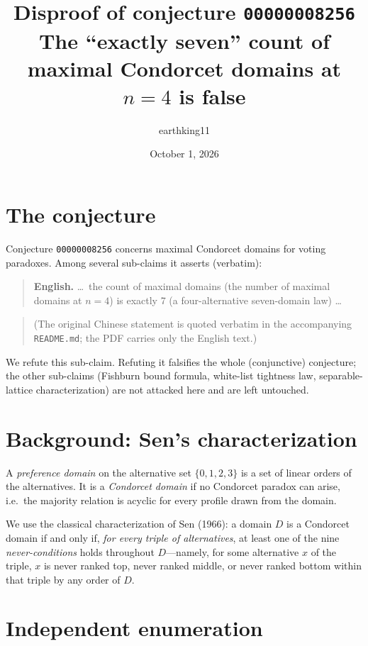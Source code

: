 \documentclass[11pt]{article}
\title{Disproof of conjecture \texttt{00000008256} \\[0.3em]
  \large The ``exactly seven'' count of maximal Condorcet domains at $n=4$ is false}
\author{earthking11}
\date{October 1, 2026}
\begin{document}
\maketitle

\section{The conjecture}

Conjecture \texttt{00000008256} concerns maximal Condorcet domains for voting
paradoxes.  Among several sub-claims it asserts (verbatim):

\begin{quote}
  \textbf{English.} \dots\ the count of maximal domains (the number of maximal
  domains at $n = 4$) is exactly 7 (a four-alternative seven-domain law) \dots
\end{quote}

\begin{quote}
  (The original Chinese statement is quoted verbatim in the accompanying
  \texttt{README.md}; the PDF carries only the English text.)
\end{quote}

We refute this sub-claim.  Refuting it falsifies the whole (conjunctive)
conjecture; the other sub-claims (Fishburn bound formula, white-list tightness
law, separable-lattice characterization) are not attacked here and are left
untouched.

\section{Background: Sen's characterization}

A \emph{preference domain} on the alternative set $\{0,1,2,3\}$ is a set of
linear orders of the alternatives.  It is a \emph{Condorcet domain} if no
Condorcet paradox can arise, i.e.\ the majority relation is acyclic for every
profile drawn from the domain.

We use the classical characterization of Sen (1966): a domain $D$ is a
Condorcet domain if and only if, \emph{for every triple of alternatives}, at
least one of the nine \emph{never-conditions} holds throughout $D$---namely,
for some alternative $x$ of the triple, $x$ is never ranked top, never ranked
middle, or never ranked bottom within that triple by any order of $D$.

\section{Independent enumeration}
\end{document}

